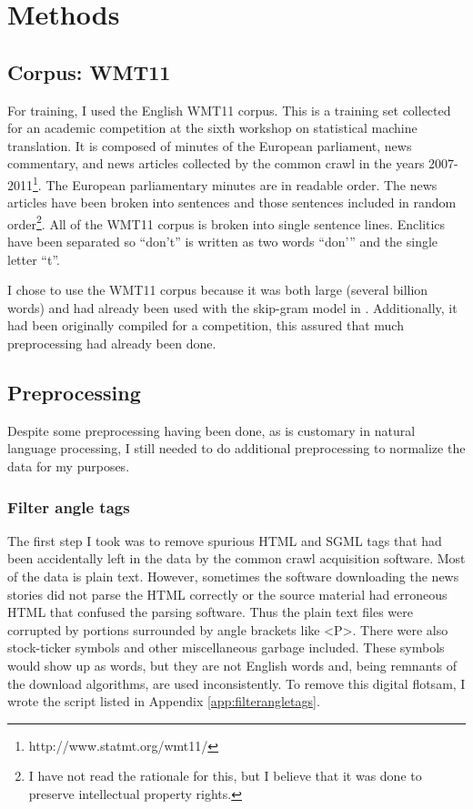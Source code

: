 \chapter{Methods}

\section{Corpus: WMT11}

For training, I used the English WMT11 corpus. This is a training set collected 
for an academic competition at the sixth workshop on statistical machine 
translation. It is composed of minutes of the European parliament, news 
commentary, and news articles collected by the common crawl in the years 
2007-2011\footnote{http://www.statmt.org/wmt11/}. The European parliamentary 
minutes are in readable order. The news articles have been broken into sentences 
and those sentences included in random order\footnote{I have not read the 
rationale for this, but I believe that it was done to preserve intellectual 
property rights.}. All of the WMT11 corpus is broken into single sentence lines. 
Enclitics have been separated so ``don't'' is written as two words 
``don'\phantom{}'' and the single letter ``t''.

I chose to use the WMT11 corpus because it was both large (several billion 
words) and had already been used with the skip-gram model in 
\citep{Mikolov2013a}. Additionally, it had been originally 
compiled for a competition, this assured that much preprocessing had already 
been done.

\section{Preprocessing}

Despite some preprocessing having been done, as is customary in natural language 
processing, I still needed to do additional preprocessing to normalize the data 
for my purposes.

\subsection{Filter angle tags}

The first step I took was to remove spurious HTML and SGML tags that had been 
accidentally left in the data by the common crawl acquisition software. Most of 
the data is plain text. However, sometimes the software downloading the news 
stories did not parse the HTML correctly or the source material had erroneous 
HTML that confused the parsing software. Thus the plain text files were 
corrupted by portions surrounded by angle brackets like <P>. There were also 
stock-ticker symbols and other miscellaneous garbage included. These symbols 
would show up as words, but they are not English words and, being remnants of 
the download algorithms, are used inconsistently. To remove this digital 
flotsam, I wrote the script  listed in 
Appendix \ref{app:filterangletags}.

